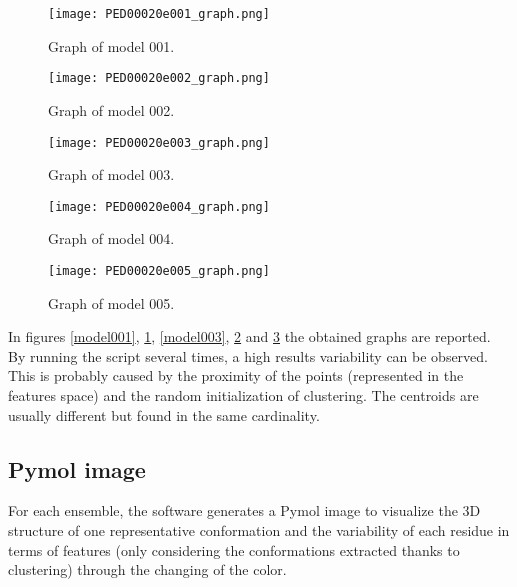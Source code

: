 \begin{figure}[H]
	\begin{minipage}[b]{0.47\textwidth}
		\centering
		\texttt{[image: PED00020e001\_graph.png]}
		\caption{Graph of model 001.}
		\label{model001}
	\end{minipage}
	\hfill
	\begin{minipage}[b]{0.47\textwidth}
		\centering
		\texttt{[image: PED00020e002\_graph.png]}
		\caption{Graph of model 002.}
		\label{model002}
	\end{minipage}
\end{figure}
\begin{figure}[H]
	\begin{minipage}[b]{0.47\textwidth}
		\centering
		\texttt{[image: PED00020e003\_graph.png]}
		\caption{Graph of model 003.}
		\label{model003}
	\end{minipage}
	\begin{minipage}[b]{0.47\textwidth}
		\centering
		\texttt{[image: PED00020e004\_graph.png]}
		\caption{Graph of model 004.}
		\label{model004}
	\end{minipage}
\end{figure}
\begin{figure}[H]
	\begin{minipage}[b]{0.47\textwidth}
		\centering
		\texttt{[image: PED00020e005\_graph.png]}
		\caption{Graph of model 005.}
		\label{model005}
	\end{minipage}
	\end{figure}

In figures \ref{model001}, \ref{model002}, \ref{model003}, \ref{model004} and \ref{model005} the obtained graphs are reported. By running the script several times, a high results variability can be observed.
This is probably caused by the proximity of the points (represented in the features space) and the random initialization of clustering. The centroids are usually different but found in the same cardinality.



\subsection{Pymol image}
For each ensemble, the software generates a Pymol image to visualize the 3D structure of one representative conformation and the variability of each residue in terms of features (only considering the conformations extracted thanks to clustering) through the changing of the color. %

